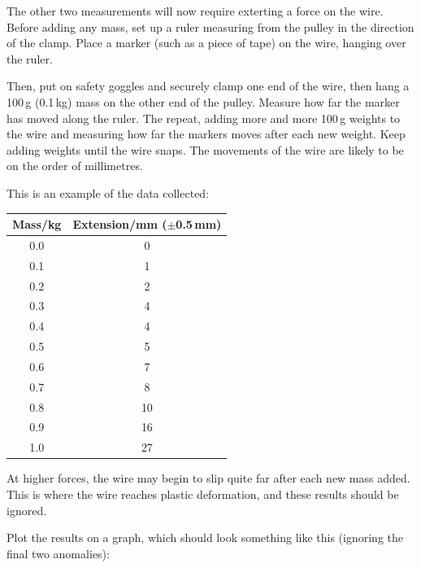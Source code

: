             The other two measurements will now require exterting a force on the wire.
            Before adding any mass, set up a ruler measuring from the pulley in the direction of the clamp.
            Place a marker (such as a piece of tape) on the wire, hanging over the ruler.
            
            Then, put on safety goggles and securely clamp one end of the wire, then hang a 100\,g (0.1\,kg) mass on the other end of the pulley.
            Measure how far the marker has moved along the ruler.
            The repeat, adding more and more 100\,g weights to the wire and measuring how far the markers moves after each new weight.
            Keep adding weights until the wire snaps.
            The movements of the wire are likely to be on the order of millimetres.

            This is an example of the data collected:

            \begin{center}
                \begin{tabular}{c|c}
                    \textbf{Mass/kg} & \textbf{Extension/mm ($\pm$0.5\,mm)} \\
                    \hline
                    0.0 & 0 \\
                    0.1 & 1 \\
                    0.2 & 2 \\
                    0.3 & 4 \\
                    0.4 & 4 \\
                    0.5 & 5 \\
                    0.6 & 7 \\
                    0.7 & 8 \\
                    0.8 & 10 \\
                    0.9 & 16 \\
                    1.0 & 27
                \end{tabular}
            \end{center}

            At higher forces, the wire may begin to slip quite far after each new mass added.
            This is where the wire reaches plastic deformation, and these results should be ignored.

            Plot the results on a graph, which should look something like this (ignoring the final two anomalies):

